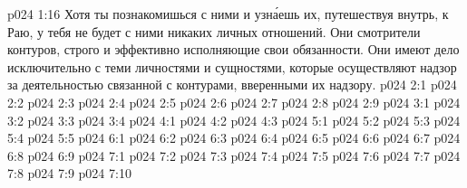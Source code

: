 \vs p024 1:16 Хотя ты познакомишься с ними и узн\'аешь их, путешествуя внутрь, к Раю, у тебя не будет с ними никаких личных отношений. Они смотрители контуров, строго и эффективно исполняющие свои обязанности. Они имеют дело исключительно с теми личностями и сущностями, которые осуществляют надзор за деятельностью связанной с контурами, вверенными их надзору.
\vs p024 2:1 
\vs p024 2:2 
\vs p024 2:3 \pc 
\vs p024 2:4 
\vs p024 2:5 
\vs p024 2:6 
\vs p024 2:7 \pc 
\vs p024 2:8 
\vs p024 2:9 
\vs p024 3:1 
\vs p024 3:2 
\vs p024 3:3 
\vs p024 3:4 
\vs p024 4:1 
\vs p024 4:2 
\vs p024 4:3 
\vs p024 5:1 
\vs p024 5:2 
\vs p024 5:3 
\vs p024 5:4 
\vs p024 5:5 \pc 
{}
\vs p024 6:1 
\vs p024 6:2 
\vs p024 6:3 
\vs p024 6:4 \pc 
\vs p024 6:5 
\vs p024 6:6 
\vs p024 6:7 
\vs p024 6:8 \pc 
\vs p024 6:9 \pc 
{}
\vs p024 7:1 
\vs p024 7:2 
\vs p024 7:3 
\vs p024 7:4 \pc 
\vs p024 7:5 
\vs p024 7:6 
\vs p024 7:7 \pc 
\vs p024 7:8 \pc 
\vs p024 7:9 
\vsetoff
\vs p024 7:10 
\quizlink
